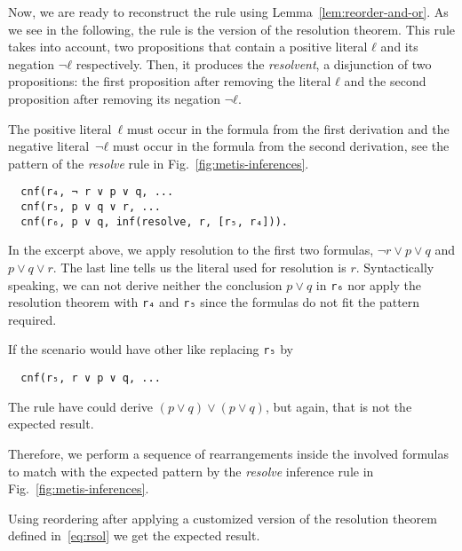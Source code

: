 \documentclass[../../main.tex]{subfiles}
\begin{document}
Now, we are ready to reconstruct the \resolve rule using
Lemma~\ref{lem:reorder-and-or}. As we see in the following, the
\resolve rule is the \Metis version of the resolution theorem. This
rule takes into account, two propositions that contain a positive
literal $ℓ$ and its negation $¬ ℓ$ respectively. Then, it produces the
\emph{resolvent}, a disjunction of two propositions: the first
proposition after removing the literal $ℓ$ and the second proposition
after removing its negation $¬ ℓ$.

The positive literal~$ℓ$ must occur in the formula from the first
derivation and the negative literal~$¬ ℓ$ must occur in the formula
from the second derivation, see the pattern of the \emph{resolve}
rule in Fig.~\ref{fig:metis-inferences}.

\begin{myexamplenum}\hspace{10cm}
\label{ex:resolve-tstp}
\begin{verbatim}
  cnf(r₄, ¬ r ∨ p ∨ q, ...
  cnf(r₅, p ∨ q ∨ r, ...
  cnf(r₆, p ∨ q, inf(resolve, r, [r₅, r₄])).
\end{verbatim}

In the excerpt above, we apply resolution to the first two formulas,
$¬ r ∨ p ∨ q$ and $p ∨ q ∨ r$.
The last line tells us the literal used
for resolution is $r$. Syntactically speaking, we can not derive
neither the conclusion $p ∨ q$ in \verb!r₆! nor apply the resolution
theorem with \verb!r₄! and \verb!r₅! since the formulas do not fit
the pattern required.

If the scenario would have other like replacing \verb!r₅! by
\begin{verbatim}
  cnf(r₅, r ∨ p ∨ q, ...
\end{verbatim}
The \resolve rule have could derive $(p ∨ q) ∨ (p ∨ q)$, but again, that is not the expected result.
\end{myexamplenum}

Therefore, we perform a sequence of rearrangements inside the
involved formulas to match with the expected pattern by the
\emph{resolve} inference rule in Fig.~\ref{fig:metis-inferences}.

Using reordering after applying a customized version of the
resolution theorem defined in~\eqref{eq:rsol} we get the expected
result.
\end{document}

